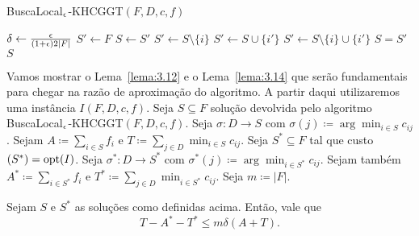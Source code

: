 \begin{algorithm}
    \caption{\sc BuscaLocal$_\epsilon$-KHCGGT$(F,D,c,f)$}
    \begin{algorithmic}[1]
        \State $\delta \gets \frac{\epsilon}{(1+\epsilon)2|F|}$
        \State $ S' \gets F $ 
        \Repeat
        \State $S\gets S'$
        \State $S' \gets S \setminus \{i\}$
        \EndIf
        \State $S' \gets S \cup \{i'\}$
        \EndIf
        \State $S' \gets S \setminus \{i\} \cup \{i'\}$
        \EndIf
        \Until $S=S'$
        \State \Return $S$
    \end{algorithmic}
\end{algorithm}
Vamos mostrar o Lema~\ref{lema:3.12} e o Lema~\ref{lema:3.14} que serão fundamentais para chegar na razão de aproximação do algoritmo. A partir daqui utilizaremos uma instância $I(F,D,c,f)$. Seja $S \subseteq F$ solução devolvida pelo algoritmo {\sc BuscaLocal$_\epsilon$-KHCGGT$(F,D,c,f)$}. Seja $\sigma : D \rightarrow S$ com $\sigma(j) \coloneqq \arg\min_{i \in S}c_{ij}$. Sejam $A \coloneqq \sum_{i \in S} f_i$ e $T \coloneqq \sum_{j\in D} \min_{i\in S}c_{ij}$. Seja $S^* \subseteq F$ tal que custo$(S^*) =\mathrm{opt}(I)$. Seja $\sigma^* : D \rightarrow S^*$ com $\sigma^*(j) \coloneqq \arg\min_{i \in S^*}c_{ij}$. Sejam também $A^* \coloneqq \sum_{i \in S^*} f_i$ e $T^* \coloneqq \sum_{j\in D} \min_{i\in S^*}c_{ij}$. Seja $m \coloneqq |F|$.
\begin{lemma}
    \label{lema:3.12}
    Sejam $S$ e $S^*$ as soluções como definidas acima. Então, vale que
    \[ T - A^* - T^* \leq m \delta (A+T).\]
\end{lemma}
